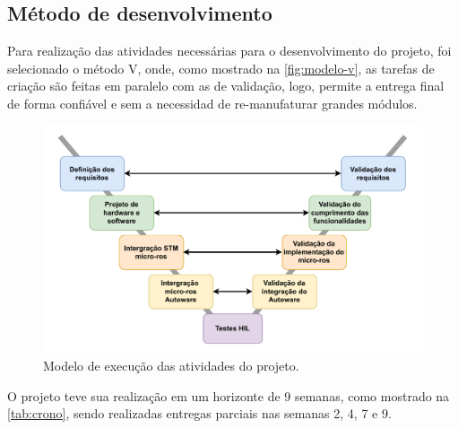 \clearpage

\subsection{Método de desenvolvimento}

Para realização das atividades necessárias para o desenvolvimento do projeto, foi selecionado o método V, onde, como mostrado na \autoref{fig:modelo-v}, as tarefas de criação são feitas em paralelo com as de validação, logo, permite a entrega final de forma confiável e sem a necessidad de re-manufaturar grandes módulos.

\begin{figure}[H]
	\centering
	\includegraphics[width=0.75\linewidth]{img/modelo-v}
	\caption{Modelo de execução das atividades do projeto.}
	\label{fig:modelo-v}
\end{figure}

O projeto teve sua realização em um horizonte de 9 semanas, como mostrado na \autoref{tab:crono}, sendo realizadas entregas parciais nas semanas 2, 4, 7 e 9.

